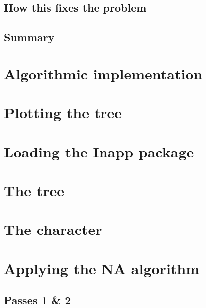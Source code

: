 \documentclass[]{book}
\theoremstyle{definition}
\theoremstyle{definition}
\theoremstyle{definition}
\theoremstyle{remark}
\begin{document}
\hypertarget{how-this-fixes-the-problem}{%
\subsection{How this fixes the
problem}\label{how-this-fixes-the-problem}}

\hypertarget{summary}{%
\subsection{Summary}\label{summary}}

\hypertarget{algorithm}{%
\section{Algorithmic implementation}\label{algorithm}}

\hypertarget{plotting-the-tree}{%
\section{Plotting the tree}\label{plotting-the-tree}}

\hypertarget{loading-the-inapp-package-1}{%
\section{Loading the Inapp package}\label{loading-the-inapp-package-1}}

\hypertarget{the-tree-1}{%
\section{The tree}\label{the-tree-1}}

\hypertarget{the-character-1}{%
\section{The character}\label{the-character-1}}

\hypertarget{applying-the-na-algorithm}{%
\section{Applying the NA algorithm}\label{applying-the-na-algorithm}}

\hypertarget{passes-1-2}{%
\subsection{Passes 1 \& 2}\label{passes-1-2}}
\end{document}
